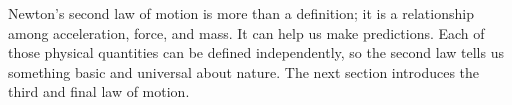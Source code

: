 \documentclass[../../main-ap-physics.tex]{subfiles}
\begin{document}
\vspace{1em}

Newton's second law of motion is more than a definition; it is a relationship among acceleration, force, and mass. It can help us make predictions. Each of those physical quantities can be defined independently, so the second law tells us something basic and universal about nature. The next section introduces the third and final law of motion.

\endsolution   
\end{document}
